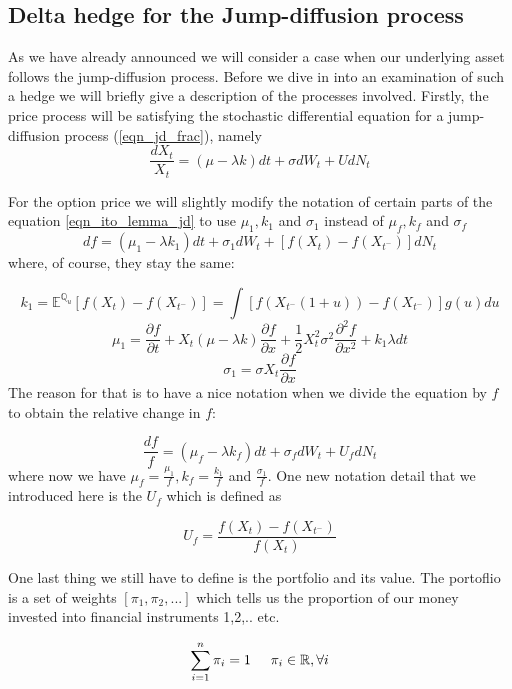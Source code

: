 \documentclass[times, utf8, diplomski]{fer}
\begin{document}
\subsection{Delta hedge for the Jump-diffusion process} \label{sec:delta_hedge_jd}
As we have already announced we will consider a case when our underlying asset follows the jump-diffusion process. Before we dive in into an examination of such a hedge we will briefly give a description of the processes involved. Firstly, the price process will be satisfying the stochastic differential equation for a jump-diffusion process (\ref{eqn_jd_frac}), namely
\begin{equation}\label{eqn_delta_hedge_x}
	\frac{dX_t}{X_t} = (\mu - \lambda k)dt + \sigma dW_t + UdN_t
\end{equation}

For the option price we will slightly modify the notation of certain parts of the equation \ref{eqn_ito_lemma_jd} to use $\mu_1, k_1$ and $\sigma_1$ instead of $\mu_f, k_f$ and $\sigma_f$
$$ df = (\mu_1 - \lambda k_1)dt + \sigma_1 dW_t + [f(X_t) - f(X_{t^-})]dN_t $$ where, of course, they stay the same:

$$ k_1 = \mathbb{E}^{\mathbb{Q}_u}[f(X_t) - f(X_{t^-})] = \int[f(X_{t^-}(1 + u)) - f(X_{t^-})]g(u)du $$
$$ \mu_1 = \frac{\partial f}{\partial t} + X_t(\mu - \lambda k)\frac{\partial f}{\partial x} + \frac{1}{2}X_t^2\sigma^2\frac{\partial^2 f}{\partial x^2} + k_1 \lambda dt $$
$$ \sigma_1 = \sigma X_t\frac{\partial f}{\partial x} $$
The reason for that is to have a nice notation when we divide the equation by $f$ to obtain the relative change in $f$:

\begin{equation} \label{eqn_delta_hedge_f}
	\frac{df}{f} = (\mu_f - \lambda k_f)dt + \sigma_f dW_t + U_fdN_t
\end{equation} where now we have $\mu_f = \frac{\mu_1}{f}, k_f = \frac{k_1}{f}$ and $\frac{\sigma_1}{f}$. One new notation detail that we introduced here is the $U_f$ which is defined as

\begin{equation}
	U_f = \frac{f(X_t) - f(X_{t^-})}{f(X_t)}
\end{equation}

One last thing we still have to define is the portfolio and its value. The portoflio is a set of weights $[\pi_1, \pi_2, ...]$ which tells us the proportion of our money invested into financial instruments 1,2,.. etc. 

$$ \sum_{i=1}^{n} \pi_i = 1 \hspace{0.5cm} \pi_i \in \mathbb{R},\forall i $$
\end{document}
